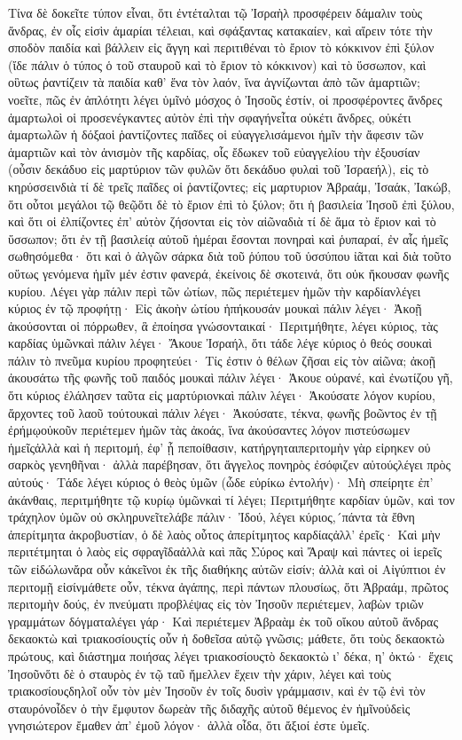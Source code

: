 Τίνα δὲ δοκεῖτε τύπον εἶναι, ὅτι ἐντέταλται τῷ Ἰσραὴλ προσφέρειν δάμαλιν τοὺς ἄνδρας, ἐν οἷς εἰσὶν ἁμαρίαι τέλειαι, καὶ σφάξαντας κατακαίεν, καὶ αἴρειν τότε τὴν σποδὸν παιδία καὶ βάλλειν εἰς ἄγγη καὶ περιτιθέναι τὸ ἔριον τὸ κόκκινον ἐπὶ ξύλον (ἴδε πάλιν ὁ τύπος ὁ τοῦ σταυροῦ καὶ τὸ ἔριον τὸ κόκκινον) καὶ τὸ ὕσσωπον, καὶ οὓτως ῥαντίζειν τὰ παιδία καθ’ ἕνα τὸν λαόν, ἵνα ἁγνίζωνται ἀπὸ τῶν ἁμαρτιῶν; νοεῖτε, πῶς ἐν ἁπλότητι λέγει ὑμῖνὁ μόσχος ὁ Ἰησοῦς ἐστίν, οἱ προσφέροντες ἄνδρες ἁμαρτωλοὶ οἱ προσενέγκαντες αὐτὸν ἐπὶ τὴν σφαγήνεἶτα οὐκέτι ἄνδρες, οὐκέτι ἁμαρτωλῶν ἡ δόξαοἱ ῥαντίζοντες παῖδες οἱ εὐαγγελισάμενοι ἡμῖν τὴν ἄφεσιν τῶν ἁμαρτιῶν καὶ τὸν ἁνισμὸν τῆς καρδίας, οἷς ἔδωκεν τοῦ εὐαγγελίου τὴν ἐξουσίαν (οὖσιν δεκάδυο εἰς μαρτύριον τῶν φυλῶν ὅτι δεκάδυο φυλαὶ τοῦ Ἰσραεήλ), εἰς τὸ κηρύσσεινδιὰ τί δὲ τρεῖς παῖδες οἱ ῥαντίζοντες; εἰς μαρτυριον Ἀβραάμ, Ἰσαάκ, Ἰακώβ, ὅτι οὗτοι μεγάλοι τῷ θεῷὅτι δὲ τὸ ἔριον ἐπὶ τὸ ξύλον; ὅτι ἡ βασιλεία Ἰησοῦ ἐπὶ ξύλου, καὶ ὅτι οἱ ἐλπίζοντες ἐπ’ αὐτὸν ζήσονται εἰς τὸν αἰῶναδιὰ τί δὲ ἅμα τὸ ἔριον καὶ τὸ ὕσσωπον; ὅτι ἐν τῇ βασιλείᾳ αὐτοῦ ἡμέραι ἔσονται πονηραὶ καὶ ῥυπαραί, ἐν αἷς ἡμεῖς σωθησόμεθα· ὅτι καὶ ὁ ἀλγῶν σάρκα διὰ τοῦ ῥύπου τοῦ ὑσσύπου ἰᾶται καὶ διὰ τοῦτο οὕτως γενόμενα ἡμῖν μέν ἐστιν φανερά, ἐκείνοις δὲ σκοτεινά, ὅτι οὐκ ἤκουσαν φωνῆς κυρίου.
Λέγει γὰρ πάλιν περὶ τῶν ὠτίων, πῶς περιέτεμεν ἡμῶν τὴν καρδίανλέγει κύριος ἐν τῷ προφήτῃ· Εἰς ἀκοὴν ὠτίου ἡπήκουσάν μουκαὶ πάλιν λέγει· Ἀκοῇ ἀκούσονται οἱ πόρρωθεν, ἃ ἐποίησα γνώσονταικαί· Περιτμήθητε, λέγει κύριος, τὰς καρδίας ὑμῶνκαὶ πάλιν λέγει· Ἄκουε Ἰσραήλ, ὅτι τάδε λέγε κύριος ὁ θεός σουκαὶ πάλιν τὸ πνεῦμα κυρίου προφητεύει· Τίς ἐστιν ὁ θέλων ζῆσαι εἰς τὸν αἰῶνα; ἀκοῇ ἀκουσάτω τῆς φωνῆς τοῦ παιδός μουκαὶ πάλιν λέγει· Ἀκουε οὐρανέ, καὶ ἐνωτίζου γῆ, ὅτι κύριος ἐλάλησεν ταῦτα εἰς μαρτύριονκαὶ πάλιν λέγει· Ἀκούσατε λόγον κυρίου, ἄρχοντες τοῦ λαοῦ τούτουκαὶ πάλιν λέγει· Ἀκούσατε, τέκνα, φωνῆς βοῶντος ἐν τῇ ἐρήμῳοὐκοῦν περιέτεμεν ἡμῶν τὰς ἀκοάς, ἵνα ἀκούσαντες λόγον πιστεύσωμεν ἡμεῖςἀλλὰ καὶ ἡ περιτομή, ἐφ’ ᾗ πεποίθασιν, κατήργηταιπεριτομὴν γὰρ εἰρηκεν οὐ σαρκὸς γενηθῆναι· ἀλλὰ παρέβησαν, ὅτι ἄγγελος πονηρὸς ἐσόφιζεν αὐτούςλέγει πρὸς αὐτούς· Τάδε λέγει κύριος ὁ θεὸς ὑμῶν (ὧδε εὑρίκω ἐντολήν)· Μὴ σπείρητε ἐπ’ ἀκάνθαις, περιτμήθητε τῷ κυρίῳ ὑμῶνκαὶ τί λέγει; Περιτμήθητε καρδίαν ὑμῶν, καὶ τον τράχηλον ὑμῶν οὐ σκληρυνεῖτελάβε πάλιν· Ἰδού, λέγει κύριος,´πάντα τὰ ἔθνη ἀπερίτμητα ἀκροβυστίαν, ὁ δὲ λαὸς οὗτος ἀπερίτμητος καρδίαςἀλλ’ ἐρεῖς· Καὶ μὴν περιτέτμηται ὁ λαὸς εἰς σφραγῖδαἀλλὰ καὶ πᾶς Σύρος καὶ Ἄραψ καὶ πάντες οἱ ἱερεῖς τῶν εἰδώλωνἄρα οὖν κἀκεῖνοι ἐκ τῆς διαθήκης αὐτῶν εἰσίν; ἀλλὰ καὶ οἱ Αἰγύπτιοι ἐν περιτομῇ εἰσίνμάθετε οὖν, τέκνα ἀγάπης, περὶ πάντων πλουσίως, ὅτι Ἀβραάμ, πρῶτος περιτομὴν δούς, ἐν πνεύματι προβλέψας εἰς τὸν Ἰησοῦν περιέτεμεν, λαβὼν τριῶν γραμμάτων δόγματαλέγει γάρ· Καὶ περιέτεμεν Ἀβραὰμ ἐκ τοῦ οἴκου αὐτοῦ ἄνδρας δεκαοκτὼ καὶ τριακοσίουςτίς οὖν ἡ δοθεῖσα αὐτῷ γνῶσις; μάθετε, ὅτι τοὺς δεκαοκτὼ πρώτους, καὶ διάστημα ποιήσας λέγει τριακοσίουςτὸ δεκαοκτὼ ι’ δέκα, η’ ὀκτώ· ἔχεις Ἰησοῦνὅτι δὲ ὁ σταυρὸς ἐν τῷ ταῦ ἤμελλεν ἔχειν τὴν χάριν, λέγει καὶ τοὺς τριακοσίουςδηλοῖ οὖν τὸν μὲν Ἰησοῦν ἐν τοῖς δυσὶν γράμμασιν, καὶ ἐν τῷ ἑνὶ τὸν σταυρόνοἶδεν ὁ τὴν ἔμφυτον δωρεὰν τῆς διδαχῆς αὐτοῦ θέμενος ἐν ἡμῖνοὐδεὶς γνησιώτερον ἔμαθεν ἀπ’ ἐμοῦ λόγον· ἀλλὰ οἶδα, ὅτι ἄξιοί ἐστε ὑμεῖς.
